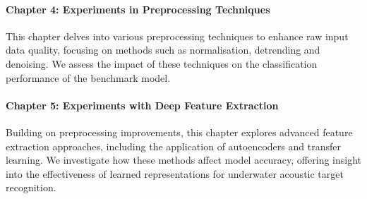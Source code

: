 \paragraph{Chapter 4: Experiments in Preprocessing Techniques} This chapter delves into various preprocessing techniques to enhance raw input data quality, focusing on methods such as normalisation, detrending and denoising. We assess the impact of these techniques on the classification performance of the benchmark model.

\paragraph{Chapter 5: Experiments with Deep Feature Extraction} Building on preprocessing improvements, this chapter explores advanced feature extraction approaches, including the application of autoencoders and transfer learning. We investigate how these methods affect model accuracy, offering insight into the effectiveness of learned representations for underwater acoustic target recognition.